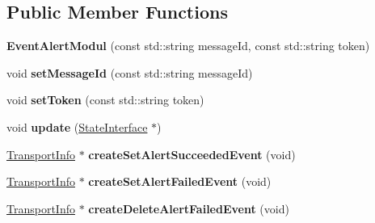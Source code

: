 \subsection*{Public Member Functions}
\begin{DoxyCompactItemize}
\item 
\mbox{\label{classAlexaEvent_1_1EventAlertModul_a4b5acf339c9ab71d9a09eaac71ed81a3}} 
{\bfseries Event\+Alert\+Modul} (const std\+::string message\+Id, const std\+::string token)
\item 
\mbox{\label{classAlexaEvent_1_1EventAlertModul_aa07aa36ac56cc1727ba102cc8f119e3a}} 
void {\bfseries set\+Message\+Id} (const std\+::string message\+Id)
\item 
\mbox{\label{classAlexaEvent_1_1EventAlertModul_a4a226a1dfd8dd0e28ad6c508d436042e}} 
void {\bfseries set\+Token} (const std\+::string token)
\item 
\mbox{\label{classAlexaEvent_1_1EventAlertModul_adf06e6101d84e73f31705278aa75e770}} 
void {\bfseries update} (\hyperlink{classAlexaEvent_1_1StateInterface}{State\+Interface} $\ast$)
\item 
\mbox{\label{classAlexaEvent_1_1EventAlertModul_a86664ac90366ee14715758f9a2671f21}} 
\hyperlink{classAlexaEvent_1_1TransportInfo}{Transport\+Info} $\ast$ {\bfseries create\+Set\+Alert\+Succeeded\+Event} (void)
\item 
\mbox{\label{classAlexaEvent_1_1EventAlertModul_a6e3e36a043a40c5749b2415e701b0c17}} 
\hyperlink{classAlexaEvent_1_1TransportInfo}{Transport\+Info} $\ast$ {\bfseries create\+Set\+Alert\+Failed\+Event} (void)
\item 
\mbox{\label{classAlexaEvent_1_1EventAlertModul_a977ba48de6c5a3fcc5998f3b8916761b}} 
\hyperlink{classAlexaEvent_1_1TransportInfo}{Transport\+Info} $\ast$ {\bfseries create\+Delete\+Alert\+Failed\+Event} (void)
\item 
\mbox{\label{classAlexaEvent_1_1EventAlertModul_ad45cfd89149851bb2866beba3ae30384}} 

\end{DoxyCompactItemize}
